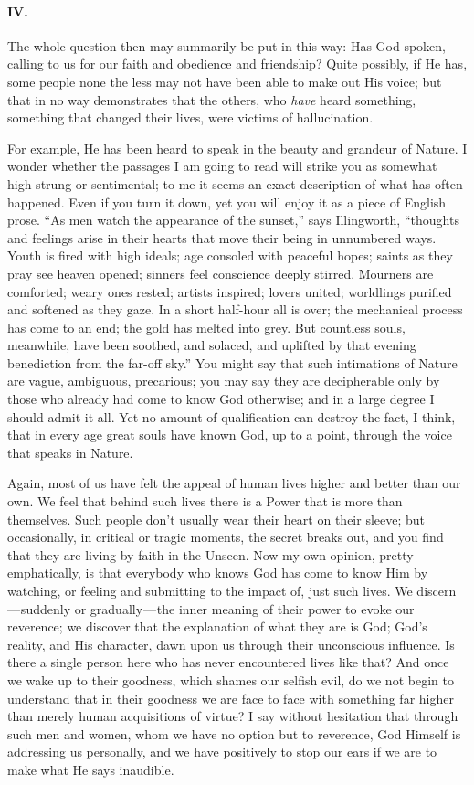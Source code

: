 \documentclass[12pt]{article}
\begin{document}
\paragraph{IV.}\label{d754}

The whole question then may summarily be put in this way: Has God
spoken, calling to us for our faith and obedience and friendship? Quite
possibly, if He has, some people none the less may not have been able to
make out His voice; but that in no way demonstrates that the others, who
\emph{have} heard something, something that changed their lives, were
victims of hallucination.

For example, He has been heard to speak in the beauty and grandeur of
Nature. I wonder whether the passages I am going to read will strike you
as somewhat high-strung or sentimental; to me it seems an exact
description of what has often happened. Even if you turn it down, yet
you will enjoy it as a piece of English prose. ``As men watch the
appearance of the sunset,'' says Illingworth, ``thoughts and feelings
arise in their hearts that move their being in unnumbered ways. Youth is
fired with high ideals; age consoled with peaceful hopes; saints as they
pray see heaven opened; sinners feel conscience deeply stirred. Mourners
are comforted; weary ones rested; artists inspired; lovers united;
worldlings purified and softened as they gaze. In a short half-hour all
is over; the mechanical process has come to an end; the gold has melted
into grey. But countless souls, meanwhile, have been soothed, and
solaced, and uplifted by that evening benediction from the far-off
sky.'' You might say that such intimations of Nature are vague,
ambiguous, precarious; you may say they are decipherable only by those
who already had come to know God otherwise; and in a large degree I
should admit it all. Yet no amount of qualification can destroy the
fact, I think, that in every age great souls have known God, up to a
point, through the voice that speaks in Nature.

Again, most of us have felt the appeal of human lives higher and better
than our own. We feel that behind such lives there is a Power that is
more than themselves. Such people don't usually wear their heart on
their sleeve; but occasionally, in critical or tragic moments, the
secret breaks out, and you find that they are living by faith in the
Unseen. Now my own opinion, pretty emphatically, is that everybody who
knows God has come to know Him by watching, or feeling and submitting to
the impact of, just such lives. We discern --- suddenly or
gradually --- the inner meaning of their power to evoke our reverence;
we discover that the explanation of what they are is God; God's reality,
and His character, dawn upon us through their unconscious influence. Is
there a single person here who has never encountered lives like that?
And once we wake up to their goodness, which shames our selfish evil, do
we not begin to understand that in their goodness we are face to face
with something far higher than merely human acquisitions of virtue? I
say without hesitation that through such men and women, whom we have no
option but to reverence, God Himself is addressing us personally, and we
have positively to stop our ears if we are to make what He says
inaudible.
\end{document}
